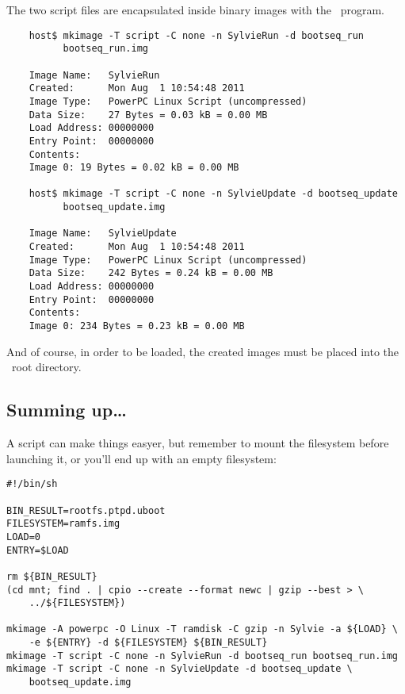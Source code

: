         The two script files are encapsulated inside binary images with
        the \mkimage\ program.
\begin{lstlisting}
    host$ mkimage -T script -C none -n SylvieRun -d bootseq_run
          bootseq_run.img

    Image Name:   SylvieRun
    Created:      Mon Aug  1 10:54:48 2011
    Image Type:   PowerPC Linux Script (uncompressed)
    Data Size:    27 Bytes = 0.03 kB = 0.00 MB
    Load Address: 00000000
    Entry Point:  00000000
    Contents:
    Image 0: 19 Bytes = 0.02 kB = 0.00 MB

    host$ mkimage -T script -C none -n SylvieUpdate -d bootseq_update
          bootseq_update.img

    Image Name:   SylvieUpdate
    Created:      Mon Aug  1 10:54:48 2011
    Image Type:   PowerPC Linux Script (uncompressed)
    Data Size:    242 Bytes = 0.24 kB = 0.00 MB
    Load Address: 00000000
    Entry Point:  00000000
    Contents:
    Image 0: 234 Bytes = 0.23 kB = 0.00 MB
\end{lstlisting}

        And of course, in order to be loaded, the created images must be
        placed into the \TFTP\ root directory.

\subsection{Summing up\dots}

    A script can make things easyer, but remember to mount the filesystem
    before launching it, or you'll end up with an empty filesystem:
\begin{lstlisting}
#!/bin/sh

BIN_RESULT=rootfs.ptpd.uboot
FILESYSTEM=ramfs.img
LOAD=0
ENTRY=$LOAD

rm ${BIN_RESULT}
(cd mnt; find . | cpio --create --format newc | gzip --best > \
    ../${FILESYSTEM})

mkimage -A powerpc -O Linux -T ramdisk -C gzip -n Sylvie -a ${LOAD} \
    -e ${ENTRY} -d ${FILESYSTEM} ${BIN_RESULT}
mkimage -T script -C none -n SylvieRun -d bootseq_run bootseq_run.img
mkimage -T script -C none -n SylvieUpdate -d bootseq_update \
    bootseq_update.img
\end{lstlisting}

